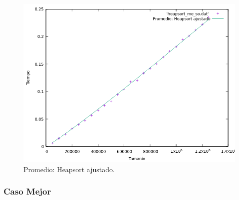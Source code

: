 \documentclass[a4paper,12pt,twoside]{article} %
\begin{document}
\begin{itemize}
\begin{figure}[h]
\begin{center}
  	\includegraphics[scale=0.8]{heapsort_me_so_a.png}
  	\caption{Promedio: Heapsort ajustado.}
  	
  \end{center}
\end{figure}
		
		
	\end{itemize}
\newpage
	
	\subsubsection{Caso Mejor}
	
\end{document}
